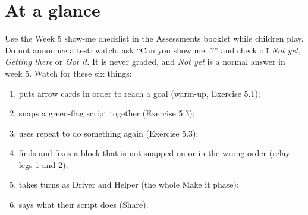\section{At a glance}
\begin{timeplan}
\end{timeplan}

\begin{teachernote}
Use the Week 5 show-me checklist in the Assessments booklet while children play. Do not announce a test: watch, ask \enquote{Can you show me\ldots?} and check off \emph{Not yet}, \emph{Getting there} or \emph{Got it}. It is never graded, and \emph{Not yet} is a normal answer in week 5. Watch for these six things:
\begin{enumerate}[leftmargin=1.4em,itemsep=0pt]
  \item puts arrow cards in order to reach a goal (warm-up, Exercise 5.1);
  \item snaps a green-flag script together (Exercise 5.3);
  \item uses repeat to do something again (Exercise 5.3);
  \item finds and fixes a block that is not snapped on or in the wrong order (relay legs 1 and 2);
  \item takes turns as Driver and Helper (the whole Make it phase);
  \item says what their script does (Share).
\end{enumerate}
\end{teachernote}

